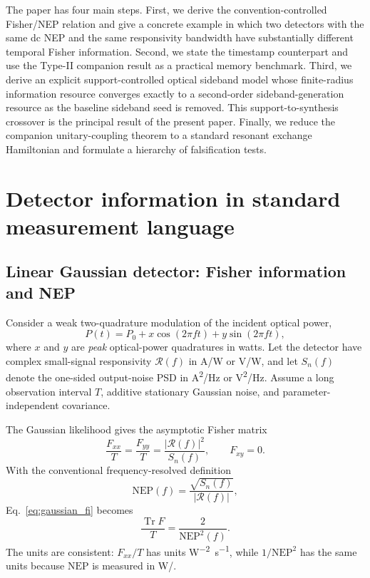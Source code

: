 \documentclass[aps,pra,reprint,superscriptaddress,longbibliography]{revtex4-2}
\newcommand{\Tr}{\operatorname{Tr}}
\begin{document}
The paper has four main steps. First, we derive the convention-controlled Fisher/NEP relation and give a concrete example in which two detectors with the same dc NEP and the same responsivity bandwidth have substantially different temporal Fisher information. Second, we state the timestamp counterpart and use the Type-II companion result as a practical memory benchmark. Third, we derive an explicit support-controlled optical sideband model whose finite-radius information resource converges exactly to a second-order sideband-generation resource as the baseline sideband seed is removed. This support-to-synthesis crossover is the principal result of the present paper. Finally, we reduce the companion unitary-coupling theorem to a standard resonant exchange Hamiltonian and formulate a hierarchy of falsification tests.

\section{Detector information in standard measurement language}

\subsection{Linear Gaussian detector: Fisher information and NEP}

Consider a weak two-quadrature modulation of the incident optical power,
\begin{equation}
P(t)=P_0+x\cos(2\pi f t)+y\sin(2\pi f t),
\label{eq:input_modulation}
\end{equation}
where $x$ and $y$ are \emph{peak} optical-power quadratures in watts. Let the detector have complex small-signal responsivity $\mathcal R(f)$ in \si{A/W} or \si{V/W}, and let $S_n(f)$ denote the one-sided output-noise PSD in \si{A^2/Hz} or \si{V^2/Hz}. Assume a long observation interval $T$, additive stationary Gaussian noise, and parameter-independent covariance.

The Gaussian likelihood gives the asymptotic Fisher matrix
\begin{equation}
\frac{F_{xx}}{T}=\frac{F_{yy}}{T}=\frac{|\mathcal R(f)|^2}{S_n(f)},
\qquad F_{xy}=0.
\label{eq:gaussian_fi}
\end{equation}
With the conventional frequency-resolved definition
\begin{equation}
\mathrm{NEP}(f)=\frac{\sqrt{S_n(f)}}{|\mathcal R(f)|},
\end{equation}
Eq.~\eqref{eq:gaussian_fi} becomes
\begin{equation}
\boxed{
\frac{\Tr F}{T}=\frac{2}{\mathrm{NEP}^2(f)}.}
\label{eq:nep_fi}
\end{equation}
The units are consistent: $F_{xx}/T$ has units \si{W^{-2}.s^{-1}}, while $1/\mathrm{NEP}^2$ has the same units because $\mathrm{NEP}$ is measured in \si{W/}.
\end{document}
